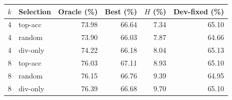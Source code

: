 \begin{tabular}{@{}rlrrrr@{}}
\toprule
$k$ & Selection & Oracle (\%) & Best (\%) & $H$ (\%) & Dev-fixed (\%) \\
\midrule
4 & top-acc & 73.98 & 66.64 & 7.34 & 65.10 \\
4 & random & 73.90 & 66.03 & 7.87 & 64.66 \\
4 & div-only & 74.22 & 66.18 & 8.04 & 65.13 \\
8 & top-acc & 76.03 & 67.11 & 8.93 & 65.10 \\
8 & random & 76.15 & 66.76 & 9.39 & 64.95 \\
8 & div-only & 76.39 & 66.68 & 9.70 & 65.10 \\
\bottomrule
\end{tabular}
